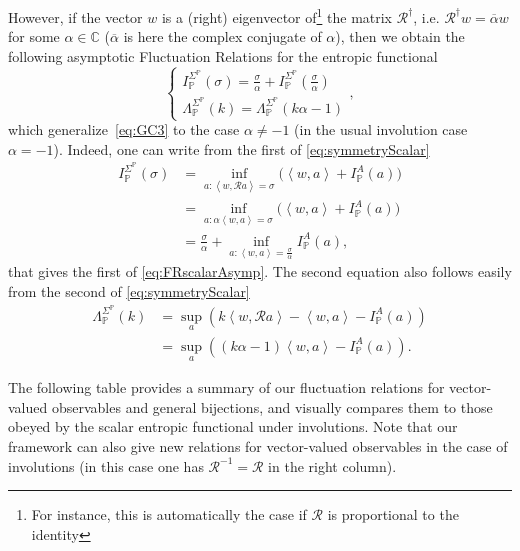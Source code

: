 \documentclass[a4paper,11pt]{article}
\numberwithin{equation}{section}
\begin{document}
However, if the vector $w$ is a (right) eigenvector of\footnote{For instance, this is automatically the case if $\mathcal{R}$ is proportional
to the identity} the matrix $\mathcal{R}^{\dagger}$, i.e. $\mathcal{R}^{\dagger}w=\overline{\alpha}w$ for some $\alpha \in \mathbb{C}$ ($\overline{\alpha}$ is here the complex conjugate of $\alpha$),
then we obtain the following asymptotic Fluctuation Relations for the entropic functional 
\begin{equation}\label{eq:FRscalarAsymp}
   \begin{cases}
I_{\mathbb{P}}^{\varSigma^{\mathbb{P}}}\left(\sigma\right)=\frac{\sigma}{\alpha}+I_{\mathbb{P}}^{\varSigma^{\mathbb{P}}}\left(\frac{\sigma}{\alpha}\right)\\
\Lambda_{\mathbb{P}}^{\varSigma^{\mathbb{P}}}\left(k\right)=\Lambda_{\mathbb{P}}^{\varSigma^{\mathbb{P}}}\left(k\alpha-1\right)
   \end{cases}, 
\end{equation}
which generalize~\eqref{eq:GC3} to the case $\alpha\neq-1$ (in the usual involution case $\alpha=-1$). Indeed, one can write from the first of \eqref{eq:symmetryScalar}
\begin{align*}
   I_{\mathbb{P}}^{\Sigma^{\mathbb{P}}}\left(\sigma\right) &=\underset{a : \left\langle w, \mathcal{R} a \right\rangle =\sigma}{\inf} \big(\left\langle w, a\right\rangle +I_{\mathbb{P}}^A\left( a\right)\big) \\
   &= \underset{a : \alpha\left\langle w, a \right\rangle =\sigma}{\inf} \big(\left\langle w, a\right\rangle +I_{\mathbb{P}}^A\left( a\right)\big) \\
   &= \frac{\sigma}{\alpha} +  \underset{a : \left\langle w, a \right\rangle =\frac{\sigma}{\alpha}}{\inf} I_{\mathbb{P}}^A\left( a\right) ,
\end{align*}
that gives the first of \eqref{eq:FRscalarAsymp}. The second equation also follows easily from the second of \eqref{eq:symmetryScalar}
\begin{align*}
    \Lambda_{\mathbb{P}}^{\Sigma^{\mathbb{P}}}\left(k \right) &=\underset{a}{\sup} \left( k \left\langle w, \mathcal{R} a \right\rangle -\left\langle w, a \right\rangle -I_{\mathbb{P}}^A\left( a \right)\right) \\
    &= \underset{a}{\sup} \left( (k \alpha - 1) \left\langle w,  a \right\rangle  -I_{\mathbb{P}}^A\left( a \right)\right) .
\end{align*}

The following table provides a summary of our fluctuation relations for vector-valued observables and general bijections, and visually compares them to those obeyed by the scalar entropic functional under involutions. Note that our framework can also give new relations for vector-valued observables in the case of involutions (in this case one has $\mathcal{R}^{-1}= \mathcal{R}$ in the right column).
\end{document}
